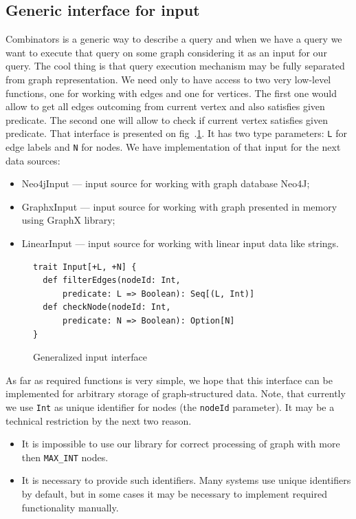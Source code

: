 \subsection{Generic interface for input}
Combinators is a generic way to describe a query and when we have a query we want to execute that query on some graph considering it as an input for our query.
The cool thing is that query execution mechanism may be fully separated from graph representation.
We need only to have access to two very low-level functions, one for working with edges and one for vertices. 
The first one would allow to get all edges outcoming from current vertex and also satisfies given predicate. 
The second one will allow to check if current vertex satisfies given predicate.
That interface is presented on fig~.\ref{fig:input}.
It has two type parameters: \lstinline{L} for edge labels and \lstinline{N} for nodes.
We have implementation of that input for the next data sources: 

\begin{itemize}
    \item Neo4jInput --- input source for working with graph database Neo4J;
    \item GraphxInput --- input source for working with graph presented in memory using GraphX library;
    \item LinearInput --- input source for working with linear input data like strings.
\end{itemize}

\begin{figure}[h]
\begin{lstlisting}
trait Input[+L, +N] {
  def filterEdges(nodeId: Int, 
      predicate: L => Boolean): Seq[(L, Int)]
  def checkNode(nodeId: Int, 
      predicate: N => Boolean): Option[N]
}

\end{lstlisting}
\caption{Generalized input interface}
\label{fig:input}
\end{figure}

As far as required functions is very simple, we hope that this interface can be implemented for arbitrary storage of graph-structured data.
Note, that currently we use \lstinline{Int} as unique identifier for nodes (the \lstinline{nodeId} parameter).
It may be a technical restriction by the next two reason.
\begin{itemize}
\item It is impossible to use our library for correct processing of graph with more then \lstinline{MAX_INT} nodes. 
\item It is necessary to provide such identifiers. Many systems use unique identifiers by default, but in some cases it may be necessary to implement required functionality manually.
\end{itemize}



